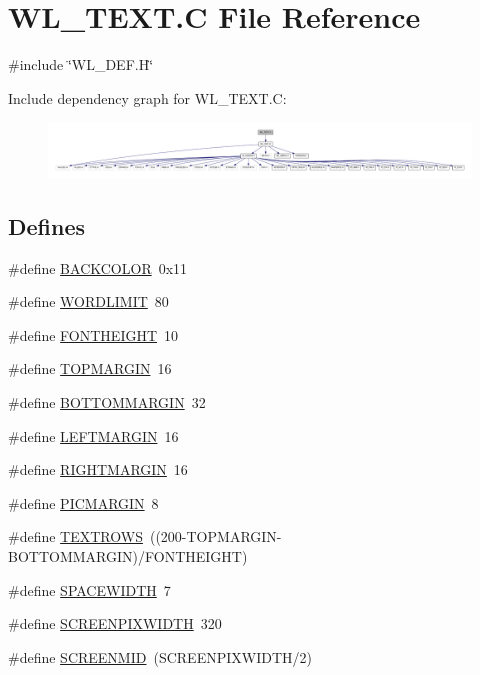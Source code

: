 \hypertarget{WL__TEXT_8C}{
\section{WL\_\-TEXT.C File Reference}
\label{WL__TEXT_8C}
}
{\ttfamily \#include \char`\"{}WL\_\-DEF.H\char`\"{}}\par
Include dependency graph for WL\_\-TEXT.C:
\nopagebreak
\begin{figure}[H]
\begin{center}
\leavevmode
\includegraphics[width=400pt]{WL__TEXT_8C__incl}
\end{center}
\end{figure}
\subsection*{Defines}
\begin{DoxyCompactItemize}
\item 
\#define \hyperlink{WL__TEXT_8C_ad71a9c1dfce508755e2d04d2cdef41e0}{BACKCOLOR}~0x11
\item 
\#define \hyperlink{WL__TEXT_8C_af6ee0ad89f70fda13767c2925b5d831f}{WORDLIMIT}~80
\item 
\#define \hyperlink{WL__TEXT_8C_afb76020ea3a049e31eef16a4bf89bdd1}{FONTHEIGHT}~10
\item 
\#define \hyperlink{WL__TEXT_8C_a750781fb573476126fd36fea5ebd3e56}{TOPMARGIN}~16
\item 
\#define \hyperlink{WL__TEXT_8C_a577fa4f3a64146902fa2a7ecaed71c28}{BOTTOMMARGIN}~32
\item 
\#define \hyperlink{WL__TEXT_8C_afb683e4c7e8d160620e6f7304c30419e}{LEFTMARGIN}~16
\item 
\#define \hyperlink{WL__TEXT_8C_ab9c51858681a43e5c47aa4c3c6b384ac}{RIGHTMARGIN}~16
\item 
\#define \hyperlink{WL__TEXT_8C_a8dbc8ce36d68d66d75e1c5667b7e5def}{PICMARGIN}~8
\item 
\#define \hyperlink{WL__TEXT_8C_a7338d62a66f372c5a177134cbd9e198a}{TEXTROWS}~((200-\/TOPMARGIN-\/BOTTOMMARGIN)/FONTHEIGHT)
\item 
\#define \hyperlink{WL__TEXT_8C_adc11e3b6b1c6fb65d8bade01c0255a3c}{SPACEWIDTH}~7
\item 
\#define \hyperlink{WL__TEXT_8C_a409c2c5ee4972d60b10fb2a716d9241e}{SCREENPIXWIDTH}~320
\item 
\#define \hyperlink{WL__TEXT_8C_ad8da423c66adb10fef50e7aedcafb4bc}{SCREENMID}~(SCREENPIXWIDTH/2)
\end{DoxyCompactItemize}
